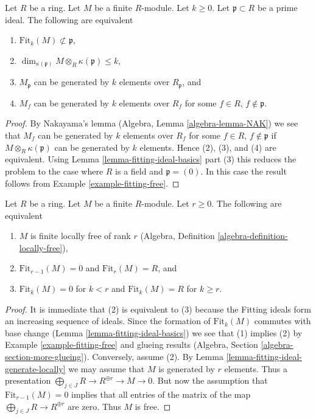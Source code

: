 \begin{lemma}
\label{lemma-fitting-ideal-generate-locally}
Let $R$ be a ring. Let $M$ be a finite $R$-module. Let $k \geq 0$.
Let $\mathfrak p \subset R$ be a prime ideal. The following
are equivalent
\begin{enumerate}
\item $\text{Fit}_k(M) \not \subset \mathfrak p$,
\item $\dim_{\kappa(\mathfrak p)} M \otimes_R \kappa(\mathfrak p) \leq k$,
\item $M_\mathfrak p$ can be generated by $k$ elements over $R_\mathfrak p$, and
\item $M_f$ can be generated by $k$ elements over $R_f$
for some $f \in R$, $f \not \in \mathfrak p$.
\end{enumerate}
\end{lemma}

\begin{proof}
By Nakayama's lemma (Algebra, Lemma \ref{algebra-lemma-NAK}) we see that
$M_f$ can be generated by $k$ elements over $R_f$ for some
$f \in R$, $f \not \in \mathfrak p$ if $M \otimes_R \kappa(\mathfrak p)$
can be generated by $k$ elements. Hence (2), (3), and (4)
are equivalent. Using
Lemma \ref{lemma-fitting-ideal-basics} part (3)
this reduces the problem to the
case where $R$ is a field and $\mathfrak p = (0)$. In this case
the result follows from Example \ref{example-fitting-free}.
\end{proof}

\begin{lemma}
\label{lemma-fitting-ideal-finite-locally-free}
Let $R$ be a ring. Let $M$ be a finite $R$-module. Let $r \geq 0$.
The following are equivalent
\begin{enumerate}
\item $M$ is finite locally free of rank $r$
(Algebra, Definition \ref{algebra-definition-locally-free}),
\item $\text{Fit}_{r - 1}(M) = 0$ and $\text{Fit}_r(M) = R$, and
\item $\text{Fit}_k(M) = 0$ for $k < r$ and $\text{Fit}_k(M) = R$
for $k \geq r$.
\end{enumerate}
\end{lemma}

\begin{proof}
It is immediate that (2) is equivalent to (3) because the Fitting ideals
form an increasing sequence of ideals.
Since the formation of $\text{Fit}_k(M)$ commutes with base change
(Lemma \ref{lemma-fitting-ideal-basics}) we see that (1) implies (2) by
Example \ref{example-fitting-free}
and glueing results (Algebra, Section \ref{algebra-section-more-glueing}).
Conversely, assume (2). By
Lemma \ref{lemma-fitting-ideal-generate-locally} we may assume that $M$
is generated by $r$ elements. Thus a presentation
$\bigoplus_{j \in J} R \to R^{\oplus r} \to M \to 0$.
But now the assumption that $\text{Fit}_{r - 1}(M) = 0$ implies
that all entries of the matrix of the map
$\bigoplus_{j \in J} R \to R^{\oplus r}$ are zero.
Thus $M$ is free.
\end{proof}

